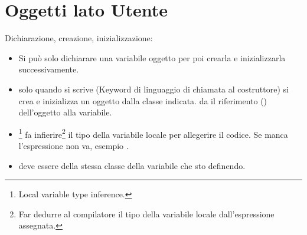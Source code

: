 \section{Oggetti lato Utente}
Dichiarazione, creazione, inizializzazione:

\begin{itemize}
	\item {} Si può solo dichiarare una variabile oggetto per poi crearla e inizializzarla successivamente.
	\item solo quando si scrive  (Keyword di linguaggio di chiamata al costruttore) si crea e inizializza un oggetto dalla classe indicata.  da il riferimento () dell'oggetto alla variabile.
	\item {}\footnote{Local variable type inference.} fa infierire\footnote{Far dedurre al compilatore il tipo della variabile locale dall'espressione assegnata.} il tipo della variabile locale per allegerire il codice. Se manca l'espressione non va, esempio .
	\item {} deve essere della stessa classe della variabile che sto definendo.
\end{itemize}
